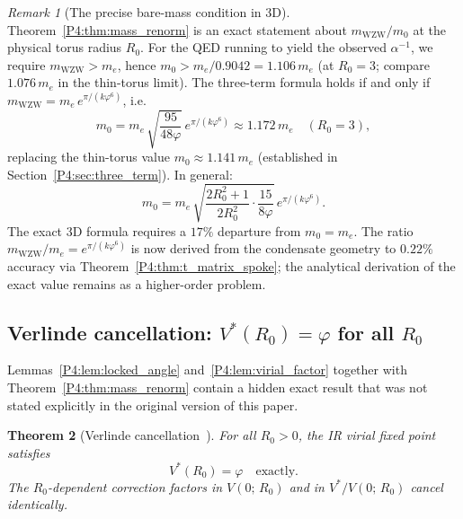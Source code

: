 \documentclass[11pt,a4paper]{article}
\newtheorem{theorem}{Theorem}[section]
\theoremstyle{definition}
\theoremstyle{remark}
\newtheorem{remark}[theorem]{Remark}
\newcommand{\vp}{\varphi}
\newcommand{\aInv}{\alpha^{-1}}
\newcommand{\mWZW}{m_{\mathrm{WZW}}}
\begin{document}
\begin{remark}[The precise bare-mass condition in 3D]
\label{P4:rem:bare_mass}
Theorem~\ref{P4:thm:mass_renorm} is an exact statement about $\mWZW/m_0$
at the physical torus radius $R_0$.  For the QED running to yield the
observed $\aInv$, we require $\mWZW > m_e$, hence
$m_0 > m_e/0.9042 = 1.106\,m_e$ (at $R_0=3$; compare $1.076\,m_e$ in the
thin-torus limit).
The three-term formula holds if and only if
$\mWZW = m_e\,e^{\pi/(k\vp^6)}$, i.e.\
\begin{equation}
  m_0 = m_e\,\sqrt{\frac{95}{48\vp}}\,e^{\pi/(k\vp^6)} \approx 1.172\,m_e
  \quad (R_0=3),
  \label{P4:eq:bare_mass_3D}
\end{equation}
replacing the thin-torus value $m_0\approx 1.141\,m_e$
(established in Section~\ref{P4:sec:three_term}).
In general:
\[
  m_0 = m_e\,\sqrt{\frac{2R_0^2+1}{2R_0^2}\cdot\frac{15}{8\vp}}\,e^{\pi/(k\vp^6)}.
\]
The exact 3D formula requires a $17\%$ departure from $m_0=m_e$.
The ratio $\mWZW/m_e = e^{\pi/(k\vp^6)}$ is now derived from the condensate
geometry to $0.22\%$ accuracy via Theorem~\ref{P4:thm:t_matrix_spoke}; the
analytical derivation of the exact value remains as a higher-order problem.
\end{remark}

\subsection{Verlinde cancellation: $V^*(R_0)=\vp$ for all $R_0$}
\label{P4:sec:verlinde_cancel}

Lemmas~\ref{P4:lem:locked_angle} and~\ref{P4:lem:virial_factor} together
with Theorem~\ref{P4:thm:mass_renorm} contain a hidden exact result that
was not stated explicitly in the original version of this paper.

\begin{theorem}[Verlinde cancellation~\cite{Verlinde1988,Paper3}]
\label{P4:thm:verlinde_cancel}
For all $R_0 > 0$, the IR virial fixed point satisfies
\begin{equation}
  V^*(R_0) = \vp \quad \text{exactly.}
  \label{P4:eq:Vstar_exact}
\end{equation}
The $R_0$-dependent correction factors in $V(0;\,R_0)$
and in $V^*/V(0;\,R_0)$ cancel identically.
\end{theorem}
\end{document}
